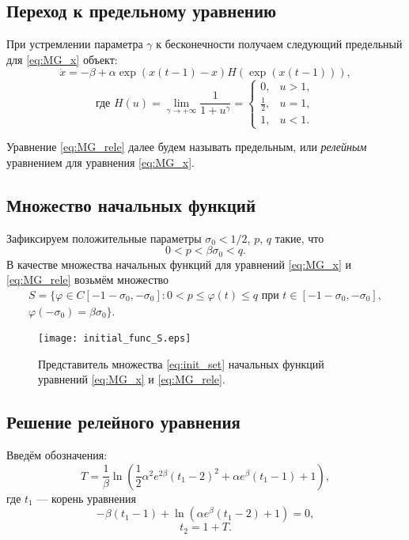 \subsection{Переход к предельному уравнению}

При устремлении параметра $\gamma$ к бесконечности получаем следующий предельный для \eqref{eq:MG_x} объект:
\begin{equation}
    \label{eq:MG_rele}
    \dot{x}=-\beta + \alpha \exp({x(t-1)-x})H(\exp({x(t-1)})),
\end{equation}
%
\begin{equation}
    \label{eq:H}
    \text{где }
    H(u)=\lim\limits_{\gamma\to +\infty}\frac{1}{1+u^{\gamma}}=
    \begin{cases}
        0, & u > 1,\\
        \frac{1}{2}, & u = 1,\\
        1, & u < 1.
    \end{cases}
\end{equation}

Уравнение \eqref{eq:MG_rele} далее будем называть предельным, или \emph{релейным} уравнением для уравнения \eqref{eq:MG_x}.

\subsection{Множество начальных функций}
Зафиксируем положительные параметры $\sigma_0 < 1/2$, $p$, $q$ такие, что 
%
\[0 < p < \beta \sigma_0 < q.\]
%
В качестве множества начальных функций для уравнений \eqref{eq:MG_x} и \eqref{eq:MG_rele} возьмём множество
\begin{multline}
    \label{eq:init_set}
    S=\{\varphi\in C[-1 - \sigma_0, -\sigma_0]: 0 < p \leqslant \varphi(t)\leqslant q \text{ при } t \in [-1 - \sigma_0, -\sigma_0],\\ \varphi(-\sigma_0) = \beta \sigma_0 \}.
\end{multline}

\begin{figure}
	\centering
	\texttt{[image: initial\_func\_S.eps]}
	\caption{Представитель множества \eqref{eq:init_set} начальных функций уравнений \eqref{eq:MG_x} и \eqref{eq:MG_rele}.}
	\label{fig:initial_funcs:ch1}
\end{figure}

\subsection{Решение релейного уравнения}
Введём обозначения:
\begin{equation}
    \label{eq:T}
    T = \frac{1}{\beta} \ln\left(\frac{1}{2}\alpha^2e^{2\beta}(t_1 - 2)^2 + \alpha e^{\beta}(t_1 - 1) + 1\right),
\end{equation}
где $t_1$ --- корень уравнения 
\begin{equation}
    \label{eq:t1_cond_exp}
    -\beta(t_1 - 1) + \ln(\alpha e^{\beta}(t_1 - 2) + 1) = 0,
\end{equation}
\begin{equation}
    \label{eq:t2_period}
    t_2 = 1 + T.
\end{equation}

